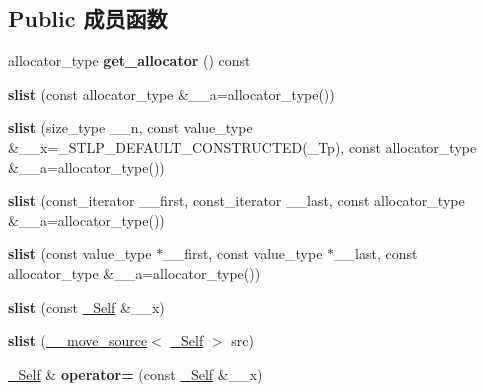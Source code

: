 \subsection*{Public 成员函数}
\begin{DoxyCompactItemize}
\item 
\mbox{\label{classslist_a9edecdb6fd71b4873a4b7fb2b247dd8f}} 
allocator\+\_\+type {\bfseries get\+\_\+allocator} () const
\item 
\mbox{\label{classslist_ace74b47cf2c4c5d6738b944e2dcdb1e1}} 
{\bfseries slist} (const allocator\+\_\+type \&\+\_\+\+\_\+a=allocator\+\_\+type())
\item 
\mbox{\label{classslist_a6c758faba4b2b1153e4df7001babc1fc}} 
{\bfseries slist} (size\+\_\+type \+\_\+\+\_\+n, const value\+\_\+type \&\+\_\+\+\_\+x=\+\_\+\+S\+T\+L\+P\+\_\+\+D\+E\+F\+A\+U\+L\+T\+\_\+\+C\+O\+N\+S\+T\+R\+U\+C\+T\+ED(\+\_\+\+Tp), const allocator\+\_\+type \&\+\_\+\+\_\+a=allocator\+\_\+type())
\item 
\mbox{\label{classslist_a2ab679da9e4fa382b1cd521c5af4a139}} 
{\bfseries slist} (const\+\_\+iterator \+\_\+\+\_\+first, const\+\_\+iterator \+\_\+\+\_\+last, const allocator\+\_\+type \&\+\_\+\+\_\+a=allocator\+\_\+type())
\item 
\mbox{\label{classslist_a665911ec97c61284eede5fa3a73a4c54}} 
{\bfseries slist} (const value\+\_\+type $\ast$\+\_\+\+\_\+first, const value\+\_\+type $\ast$\+\_\+\+\_\+last, const allocator\+\_\+type \&\+\_\+\+\_\+a=allocator\+\_\+type())
\item 
\mbox{\label{classslist_af378f800b391d2018df9473f131c8678}} 
{\bfseries slist} (const \hyperlink{classslist}{\+\_\+\+Self} \&\+\_\+\+\_\+x)
\item 
\mbox{\label{classslist_a77d6e9d0cd663c719756dd399adb6f1a}} 
{\bfseries slist} (\hyperlink{class____move__source}{\+\_\+\+\_\+move\+\_\+source}$<$ \hyperlink{classslist}{\+\_\+\+Self} $>$ src)
\item 
\mbox{\label{classslist_a03fce4df0ea6afbf49c2008b96f3f0e7}} 
\hyperlink{classslist}{\+\_\+\+Self} \& {\bfseries operator=} (const \hyperlink{classslist}{\+\_\+\+Self} \&\+\_\+\+\_\+x)

\end{DoxyCompactItemize}
